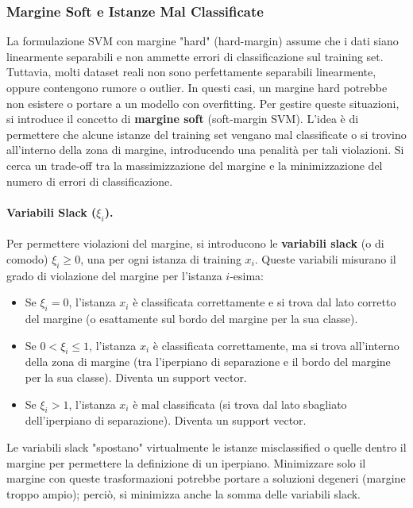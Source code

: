 \documentclass{article}
\begin{document}
\subsubsection{Margine Soft e Istanze Mal Classificate}
La formulazione SVM con margine "hard" (hard-margin) assume che i dati siano linearmente separabili e non ammette errori di classificazione sul training set. Tuttavia, molti dataset reali non sono perfettamente separabili linearmente, oppure contengono rumore o outlier. In questi casi, un margine hard potrebbe non esistere o portare a un modello con overfitting.
Per gestire queste situazioni, si introduce il concetto di \textbf{margine soft} (soft-margin SVM). L'idea è di permettere che alcune istanze del training set vengano mal classificate o si trovino all'interno della zona di margine, introducendo una penalità per tali violazioni. Si cerca un trade-off tra la massimizzazione del margine e la minimizzazione del numero di errori di classificazione.

\paragraph{Variabili Slack ($\xi_i$).}
Per permettere violazioni del margine, si introducono le \textbf{variabili slack} (o di comodo) $\xi_i \ge 0$, una per ogni istanza di training $x_i$. Queste variabili misurano il grado di violazione del margine per l'istanza $i$-esima:
\begin{itemize}
    \item Se $\xi_i = 0$, l'istanza $x_i$ è classificata correttamente e si trova dal lato corretto del margine (o esattamente sul bordo del margine per la sua classe).
    \item Se $0 < \xi_i \le 1$, l'istanza $x_i$ è classificata correttamente, ma si trova all'interno della zona di margine (tra l'iperpiano di separazione e il bordo del margine per la sua classe). Diventa un support vector.
    \item Se $\xi_i > 1$, l'istanza $x_i$ è mal classificata (si trova dal lato sbagliato dell'iperpiano di separazione). Diventa un support vector.
\end{itemize}
Le variabili slack "spostano" virtualmente le istanze misclassified o quelle dentro il margine per permettere la definizione di un iperpiano. Minimizzare solo il margine con queste trasformazioni potrebbe portare a soluzioni degeneri (margine troppo ampio); perciò, si minimizza anche la somma delle variabili slack.
\end{document}
